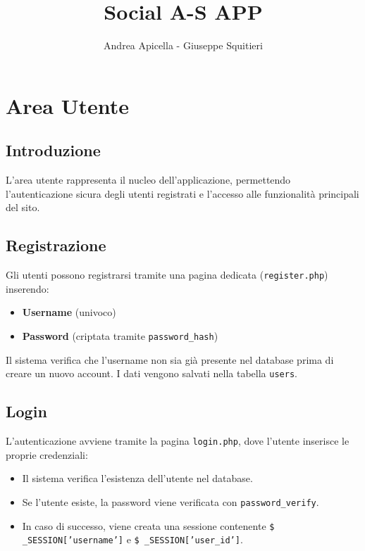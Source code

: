 \documentclass{article}
\title{Social A-S APP}
\author{Andrea Apicella - Giuseppe Squitieri}
\theoremstyle{mytheoremstyle}
\theoremstyle{mytheoremstyle}
\theoremstyle{myproblemstyle}
\begin{document}
    \maketitle

    \tableofcontents

    \newpage

    \section{Area Utente}
    \subsection{Introduzione}
    L'area utente rappresenta il nucleo dell'applicazione, permettendo l'autenticazione sicura degli utenti registrati e l'accesso alle funzionalità principali del sito.

    \subsection{Registrazione}
    Gli utenti possono registrarsi tramite una pagina dedicata (\texttt{register.php}) inserendo:
    \begin{itemize}
        \item \textbf{Username} (univoco)
        \item \textbf{Password} (criptata tramite \texttt{password\_hash})
    \end{itemize}
    Il sistema verifica che l'username non sia già presente nel database prima di creare un nuovo account. I dati vengono salvati nella tabella \texttt{users}.

    \subsection{Login}
    L'autenticazione avviene tramite la pagina \texttt{login.php}, dove l'utente inserisce le proprie credenziali:
    \begin{itemize}
        \item Il sistema verifica l’esistenza dell’utente nel database.
        \item Se l’utente esiste, la password viene verificata con \texttt{password\_verify}.
        \item In caso di successo, viene creata una sessione contenente \texttt{\$ \_SESSION['username']} e \texttt{\$ \_SESSION['user\_id']}.
    \end{itemize}
\end{document}
